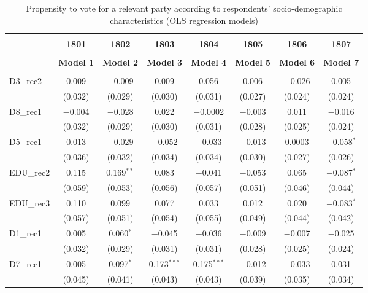 \documentclass[
]{article}
\begin{document}
\begin{table}[!htbp] \centering 
  \caption{Propensity to vote for a relevant party according to respondents' 
                     socio-demographic characteristics (OLS regression models)} 
  \label{table:full_ols_lu} 
\begin{tabular}{@{\extracolsep{5pt}}lccccccc} 
\\[-1.8ex]\hline \\[-1.8ex] 
 & \textbf{1801} & \textbf{1802} & \textbf{1803} & \textbf{1804} & \textbf{1805} & \textbf{1806} & \textbf{1807} \\ 
\\[-1.8ex] & \textbf{Model 1} & \textbf{Model 2} & \textbf{Model 3} & \textbf{Model 4} & \textbf{Model 5} & \textbf{Model 6} & \textbf{Model 7}\\ 
\hline \\[-1.8ex] 
 D3\_rec2 & 0.009 & $-$0.009 & 0.009 & 0.056 & 0.006 & $-$0.026 & 0.005 \\ 
  & (0.032) & (0.029) & (0.030) & (0.031) & (0.027) & (0.024) & (0.024) \\ 
  D8\_rec1 & $-$0.004 & $-$0.028 & 0.022 & $-$0.0002 & $-$0.003 & 0.011 & $-$0.016 \\ 
  & (0.032) & (0.029) & (0.030) & (0.031) & (0.028) & (0.025) & (0.024) \\ 
  D5\_rec1 & 0.013 & $-$0.029 & $-$0.052 & $-$0.033 & $-$0.013 & 0.0003 & $-$0.058$^{*}$ \\ 
  & (0.036) & (0.032) & (0.034) & (0.034) & (0.030) & (0.027) & (0.026) \\ 
  EDU\_rec2 & 0.115 & 0.169$^{**}$ & 0.083 & $-$0.041 & $-$0.053 & 0.065 & $-$0.087$^{*}$ \\ 
  & (0.059) & (0.053) & (0.056) & (0.057) & (0.051) & (0.046) & (0.044) \\ 
  EDU\_rec3 & 0.110 & 0.099 & 0.077 & 0.033 & 0.012 & 0.020 & $-$0.083$^{*}$ \\ 
  & (0.057) & (0.051) & (0.054) & (0.055) & (0.049) & (0.044) & (0.042) \\ 
  D1\_rec1 & 0.005 & 0.060$^{*}$ & $-$0.045 & $-$0.036 & $-$0.009 & $-$0.007 & $-$0.025 \\ 
  & (0.032) & (0.029) & (0.031) & (0.031) & (0.028) & (0.025) & (0.024) \\ 
  D7\_rec1 & 0.005 & 0.097$^{*}$ & 0.173$^{***}$ & 0.175$^{***}$ & $-$0.012 & $-$0.033 & 0.031 \\ 
  & (0.045) & (0.041) & (0.043) & (0.043) & (0.039) & (0.035) & (0.034) \\ 

\end{tabular}
\end{table}
\end{document}
